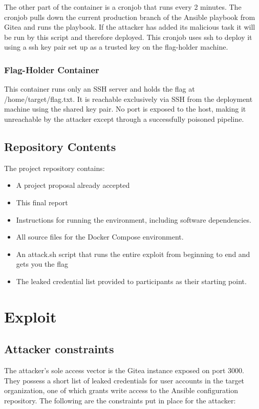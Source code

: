 \documentclass{article}
\begin{document}
The other part of the container is a cronjob that runs every 2 minutes. The cronjob pulls down the current production branch of the Ansible playbook from Gitea and runs the playbook. If the attacker has added its malicious task it will be run by this script and therefore deployed. This cronjob uses ssh to deploy it using a ssh key pair set up as a trusted key on the flag-holder machine.

\subsubsection{Flag-Holder Container}

This container runs only an SSH server and holds the flag at /home/target/flag.txt. It is reachable exclusively via SSH from the deployment machine using the shared key pair. No port is exposed to the host, making it unreachable by the attacker except through a successfully poisoned pipeline.

\subsection{Repository Contents}

The project repository contains:

\begin{itemize}
    \item A project proposal already accepted
    \item This final report
    \item Instructions for running the environment, including software dependencies.
    \item All source files for the Docker Compose environment.
    \item An attack.sh script that runs the entire exploit from beginning to end and gets you the flag
    \item The leaked credential list provided to participants as their starting point.
\end{itemize}

\section{Exploit}

\subsection{Attacker constraints}
The attacker's sole access vector is the Gitea \cite{giteaDocs} instance exposed on port 3000. They possess a short list of leaked credentials for user accounts in the target organization, one of which grants write access to the Ansible \cite{ansibleDocs} configuration repository. The following are the constraints put in place for the attacker:
\end{document}
